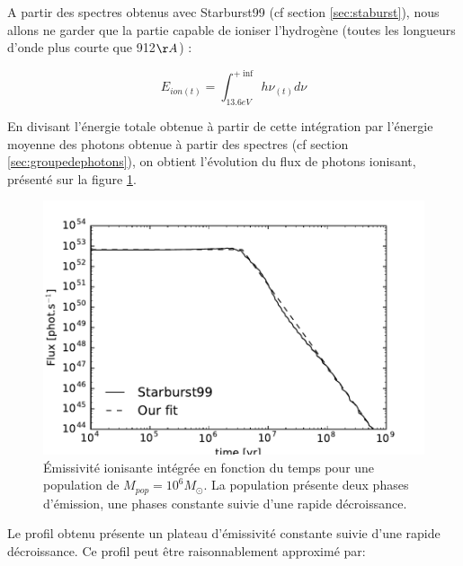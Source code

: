 


A partir des spectres obtenus avec Starburst99 (cf section \ref{sec:staburst}), nous allons ne garder que la partie capable de ioniser l'hydrogène (toutes les longueurs d'onde plus courte que 912$\AA$) :

\begin{equation}
E_{ion (t)} = \int_{13.6eV}^{+\inf} h \nu_{(t)} d\nu
\end{equation}

En divisant l'énergie totale obtenue à partir de cette intégration par l'énergie moyenne des photons obtenue à partir des spectres (cf section \ref{sec:groupedephotons}), on obtient l'évolution du flux de photons ionisant, présenté sur la figure \ref{fig:flux}.
\begin{figure}
        \includegraphics[width=.95\linewidth]{img/03/flux.pdf} 
        \caption[Émissivité ionisante]{Émissivité ionisante intégrée en fonction du temps pour une population de $M_{pop}=10^6 M_\odot$.
        La population présente deux phases d'émission, une phases constante suivie d'une rapide décroissance.
 		\label{fig:flux}}
\end{figure}
Le profil obtenu présente un plateau d'émissivité constante suivie d'une rapide décroissance.
Ce profil peut être raisonnablement approximé par:

